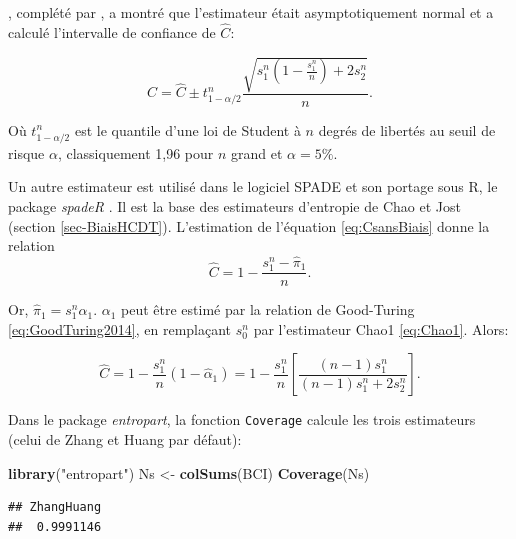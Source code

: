 \documentclass[
  11pt,
  french,
  a4paper,
  extrafontsizes,onecolumn,openright
  ]{memoir}
\newenvironment{Shaded}{\begin{snugshade}}{\end{snugshade}}
\newcommand{\FunctionTok}[1]{\textcolor[rgb]{0.13,0.29,0.53}{\textbf{#1}}}
\newcommand{\NormalTok}[1]{#1}
\newcommand{\OtherTok}[1]{\textcolor[rgb]{0.56,0.35,0.01}{#1}}
\newcommand{\StringTok}[1]{\textcolor[rgb]{0.31,0.60,0.02}{#1}}
\begin{document}
\textcite{Esty1983}, complété par \textcite{Zhang2009}, a montré que l'estimateur était asymptotiquement normal et a calculé l'intervalle de confiance de \(\hat{C}\):

\begin{equation}
  \label{eq:hatC}
  C=\hat{C}\pm t^{n}_{1-\alpha/2} \frac{\sqrt{s^{n}_{1}\left(1-\frac{s^{n}_{1}}{n}\right)+2s^{n}_{2}}}{n}.
\end{equation}

Où \(t^{n}_{1-\alpha/2}\) est le quantile d'une loi de Student à \(n\) degrés de libertés au seuil de risque \(\alpha\), classiquement 1,96 pour \(n\) grand et \(\alpha=5\%\).

Un autre estimateur est utilisé dans le logiciel SPADE \autocite{Chao2010a} et son portage sous R, le package \emph{spadeR} \autocite{Chao2016c}.
Il est la base des estimateurs d'entropie de Chao et Jost (section \ref{sec-BiaisHCDT}).
L'estimation de l'équation \eqref{eq:CsansBiais} donne la relation
\begin{equation}
  \label{eq:hatC2}
  \hat{C} = 1-\frac{s^{n}_{1} - \hat{\pi}_1}{n}.
\end{equation}

Or, \(\hat{\pi}_1 = s^{n}_{1} \hat{\alpha}_1\).
\(\alpha_1\) peut être estimé par la relation de Good-Turing \eqref{eq:GoodTuring2014}, en remplaçant \(s^{n}_{0}\) par l'estimateur Chao1 \eqref{eq:Chao1}.
Alors:

\begin{equation} 
  \label{eq:CChao}
  \hat{C} = 1-\frac{s^{n}_{1}}{n}(1 - \hat{\alpha}_1)
  = 1-\frac{s^{n}_{1}}{n}\left[\frac{\left(n-1\right)s^{n}_{1}}{\left(n-1\right)s^{n}_{1}+2s^{n}_{2}}\right].
\end{equation}

Dans le package \emph{entropart}, la fonction \texttt{Coverage} calcule les trois estimateurs (celui de Zhang et Huang par défaut):

\scriptsize

\begin{Shaded}
\begin{Highlighting}[]
\FunctionTok{library}\NormalTok{(}\StringTok{"entropart"}\NormalTok{)}
\NormalTok{Ns }\OtherTok{\textless{}{-}} \FunctionTok{colSums}\NormalTok{(BCI)}
\FunctionTok{Coverage}\NormalTok{(Ns)}
\end{Highlighting}
\end{Shaded}

\begin{verbatim}
## ZhangHuang 
##  0.9991146
\end{verbatim}
\end{document}

